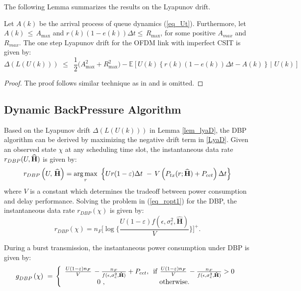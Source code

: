 \documentclass[11pt,journal, onecolumn]{./IEEEtran}
\newcommand{\red}{\color{black}}
\begin{document}
The following Lemma summarizes the results on the Lyapunov drift. {\red
\begin{Lemma}\label{lem_lyaD} Let $A(k)$ be the arrival process of queue dynamics (\ref{eq_Ut}). Furthermore, let $A(k)\, \le \,{A_{\max }}$ and $r(k)(1 - e(k) )\Delta t \le \,{R_{\max }}$, for some positive $A_{max}$ and $R_{max}$. The one step Lyapunov drift for the OFDM link with imperfect CSIT is given by:
\begin{equation}\label{LyaD}
\Delta \left( {L(U(k))} \right)\,\, \le \,\,\,\frac{1}{2 }\big(A_{\max }^{2 } + R_{\max }^{2 }\big) - \mathbb E\left[ U{{(k)} }\left\{ {r(k)(1 - e(k) )\Delta t - A(k)} \right\}\,\left| {\,\,U(k)} \right. \right]
\end{equation}
\end{Lemma}
\begin{proof}
The proof follows similar technique as in \cite{georgiadis_resource_2006} and is omitted.
\end{proof}
}


\subsection{Dynamic BackPressure Algorithm}
Based on the Lyapunov drift $\Delta \left( {L(U(k) )} \right)$ in Lemma \ref{lem_lyaD}, the DBP algorithm can be derived by maximizing the negative drift term in \eqref{LyaD}. Given an observed state $\chi$ at any scheduling time slot, the instantaneous data rate $r_{DBP}(U,\widehat{\bf{H}})$ is given by:
\begin{equation}\label{eq_ropt1}
{r_{DBP}}\left( {U,\,\widehat{\bf{H}}} \right) = \mathop {\arg \max }\limits_r \,\,\left\{ {{U }r(1 - {\varepsilon})\Delta t\,\, - \,V\left( {{P_{tx}}(r;\widehat{\bf{H}}) + {P_{cct}}} \right)\Delta t} \right\}
\end{equation}
where $V$ is a constant which determines the tradeoff between power consumption and delay performance. Solving the problem in (\ref{eq_ropt1}) for the DBP, the instantaneous data rate ${r_{DBP}}(\chi)$ is given by:
\begin{equation}\label{eq_ropt2}
{r_{DBP}}\left( \chi  \right) = {n_F}{\bigg[ {\log \Big\{ {\frac{{{U }(1 - {\varepsilon})f(\epsilon,\sigma_e^2,\mathbf{\hat{H}})}}{V}} \Big\}} \bigg]^ + }.
\end{equation}

During a burst transmission, the instantaneous power consumption under DBP is given by:
\begin{equation}\label{eq_Popt}
g_{DBP}^{}\left( \chi  \right)\,\, = \,\left\{ {\begin{array}{*{20}{c}}
   {\frac{{{U }(1 - {\varepsilon}){n_F}}}{V}\, - \frac{{{n_F}}}{{f(\epsilon,\sigma_e^2,\mathbf{\hat{H}})}} + {P_{cct}},\,\,\,{\rm{if}}\,\,\frac{{{U}(1 - {\varepsilon}){n_F}}}{V}\, - \frac{{{n_F}}}{f(\epsilon,\sigma_e^2,\mathbf{\hat{H}})} > 0}  \\
   {0\,\,,\,\,\,\,\,\,\,\,\,\,\,\,\,\,\,\,\,\,\,\,\,\,\,\,\,\,\,\,\,\,\,\,\,\,\,\,\,\,\,\,\,\,\,\,\,\,\,{\rm{otherwise}.}\,\,\,\,\,\,\,\,\,\,\,}  \\
\end{array}} \right.
\end{equation}
\end{document}
